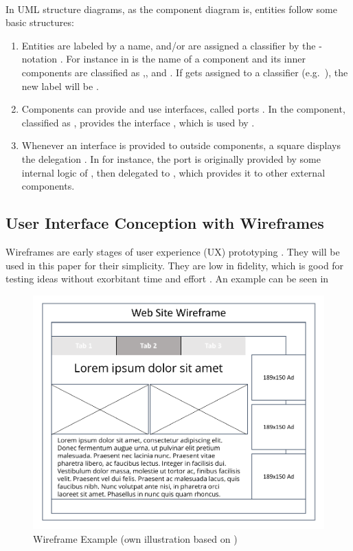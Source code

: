 \paragraph{} In UML structure diagrams, as the component diagram is, entities follow some basic structures:

\begin{enumerate}
    \item Entities are labeled by a name, and/or are assigned a  classifier by the \ssay{:[classifier]}-notation  \parencite[cf.][125]{ObjectManagementGroup.01.03.2015}. For instance in   is the name of a component and its inner components are classified as ,, and . If  gets assigned to a classifier (e.g.~), the new label will be .
    
    \item Components can provide and use interfaces, called ports \parencite[cf.][182-184]{ObjectManagementGroup.01.03.2015}. In  the component, classified as , provides the interface , which is used by .
    
    \item Whenever an interface is provided to outside components, a square displays the delegation \parencite[cf.][212]{ObjectManagementGroup.01.03.2015}. In  for instance, the port  is originally provided by some internal logic of , then delegated to , which provides it to other external components. 
\end{enumerate}


\subsection{User Interface Conception with Wireframes}

Wireframes are early stages of user experience (UX) prototyping \parencite[cf.][]{Rosenzweig.2015}. They will be used in this paper for their simplicity. They are low in fidelity, which is good for testing ideas without exorbitant time and effort \parencite[cf.][]{Platt.2016}. An example can be seen in 

\begin{figure}[H]
    \centering
    \includegraphics[height=.5\textheight]{img/WireFrameEx.pdf}
    \caption[Wireframe Example]{Wireframe Example (own illustration based on \cite{Rosenzweig.2015})}
    \label{fig:wrEx}
\end{figure}